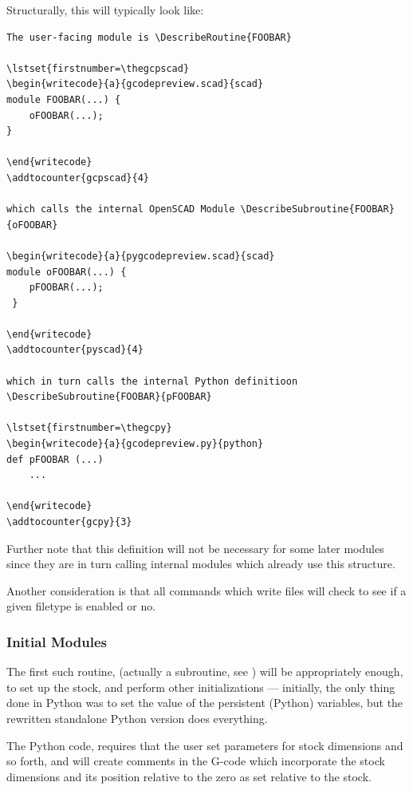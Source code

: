 \documentclass{ltxdoc}
\begin{document}
Structurally, this will typically look like:

\begin{verbatim}
The user-facing module is \DescribeRoutine{FOOBAR}

\lstset{firstnumber=\thegcpscad}
\begin{writecode}{a}{gcodepreview.scad}{scad}
module FOOBAR(...) {
    oFOOBAR(...);
}

\end{writecode}
\addtocounter{gcpscad}{4}
 
which calls the internal OpenSCAD Module \DescribeSubroutine{FOOBAR}{oFOOBAR}

\begin{writecode}{a}{pygcodepreview.scad}{scad}
module oFOOBAR(...) {
    pFOOBAR(...);
 }
 
\end{writecode}
\addtocounter{pyscad}{4}

which in turn calls the internal Python definitioon \DescribeSubroutine{FOOBAR}{pFOOBAR}

\lstset{firstnumber=\thegcpy}
\begin{writecode}{a}{gcodepreview.py}{python}
def pFOOBAR (...)
    ...
    
\end{writecode}
\addtocounter{gcpy}{3}
\end{verbatim}

Further note that this definition will not be necessary for some later modules since they are in turn calling internal modules which already use this structure.

Another consideration is that all commands which write files will check to see if a given filetype is enabled or no.



\subsubsection{Initial Modules}

The first such routine, (actually a subroutine, see )  will be appropriately enough, to set up the stock, and perform other initializations --- initially, the only thing done in Python was to set the value of the persistent (Python) variables, but the rewritten standalone Python version does everything.

The Python code,  requires that the user set parameters for stock dimensions and so forth, and will create comments in the G-code which incorporate the stock dimensions and its position relative to the zero as set relative to the stock.
 
\end{document}

